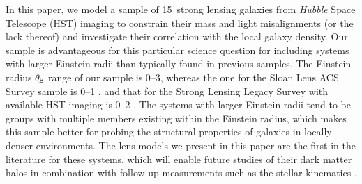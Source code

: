 \documentclass{aa}
\newcommand{\nlens}{15}
\newcommand{\newedit}[1]{{#1}} %
\begin{document}
In this paper, we model a sample of \nlens\ strong lensing galaxies from \textit{Hubble} Space Telescope (HST) imaging to constrain their mass and light misalignments (or the lack thereof) and investigate their correlation with the local galaxy density. Our sample is advantageous for this particular science question for including systems with larger Einstein radii than typically found in previous samples. The Einstein radius $\theta_{\rm E}$ range of our sample is \newedit{0--3}, whereas the one for the Sloan Lens ACS Survey \citep[SLACS;][]{Bolton06} sample is \newedit{0--1} \citep{Auger09}, and that for the Strong Lensing Legacy Survey \citep[SL2S;][]{Gavazzi12} with available HST imaging is \newedit{0--2} \citep{Tan24, Sheu24}. The systems with larger Einstein radii tend to be groups with multiple members existing within the Einstein radius, which makes this sample better for probing the structural properties of galaxies in locally denser environments. The lens models we present in this paper are the first in the literature for these systems, which will enable future studies of their dark matter halos in combination with follow-up measurements such as the stellar kinematics \citep[e.g.,][]{Tran22, Tan24, Sheu24}.

\end{document}
